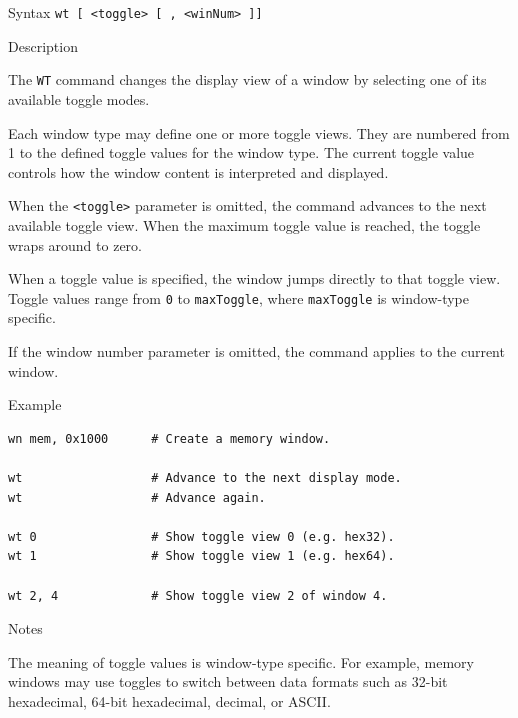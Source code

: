%
%
\pagebreak
{}

\begin{iPageDescEntry}{Syntax}
\texttt{wt [ <toggle> [ , <winNum> ]]} \\
\end{iPageDescEntry}

\begin{iPageDescEntry}{Description}

The \texttt{WT} command changes the display view of a window by selecting one of
its available toggle modes.

Each window type may define one or more toggle views. They are numbered from 1 to the defined toggle values for the window type. The current toggle value controls how the window content is interpreted and displayed.

When the \texttt{<toggle>} parameter is omitted, the command advances to the next available toggle view. When the maximum toggle value is reached, the toggle wraps around to zero.

When a toggle value is specified, the window jumps directly to that toggle view. Toggle values range from \texttt{0} to \texttt{maxToggle}, where \texttt{maxToggle} is window-type specific.

If the window number parameter is omitted, the command applies to the current window.

\end{iPageDescEntry}

\begin{iPageDescOpEntry}{Example}
\begin{lstlisting}[style=iPageOpStyle]
wn mem, 0x1000      # Create a memory window.

wt                  # Advance to the next display mode.
wt                  # Advance again.

wt 0                # Show toggle view 0 (e.g. hex32).
wt 1                # Show toggle view 1 (e.g. hex64).

wt 2, 4             # Show toggle view 2 of window 4.

\end{lstlisting}
\end{iPageDescOpEntry}

\begin{iPageDescEntry}{Notes}

The meaning of toggle values is window-type specific.  
For example, memory windows may use toggles to switch between data formats such as 32-bit hexadecimal, 64-bit hexadecimal, decimal, or ASCII.

\end{iPageDescEntry}
